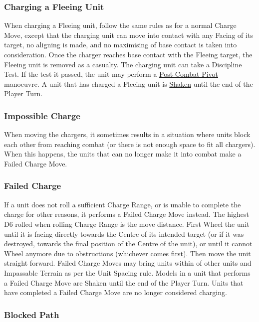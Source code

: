 \subsubsection{Charging a Fleeing Unit}

When charging a Fleeing unit, follow the same rules as for a normal Charge Move, except that the charging unit can move into contact with any Facing of its target, no aligning is made, and no maximising of base contact is taken into consideration. Once the charger reaches base contact with the Fleeing target, the Fleeing unit is removed as a casualty. The charging unit can take a Discipline Test. If the test it passed, the unit may perform a \hyperref[post_combat_pivot]{Post-Combat Pivot} manoeuvre. A unit that has charged a Fleeing unit is \hyperref[shaken]{Shaken} until the end of the Player Turn.

\subsubsection{Impossible Charge}

When moving the chargers, it sometimes results in a situation where units block each other from reaching combat (or there is not enough space to fit all chargers). When this happens, the units that can no longer make it into combat make a Failed Charge Move.

\subsubsection{Failed Charge}
\label{failed_charge}

If a unit does not roll a sufficient Charge Range, or is unable to complete the charge for other reasons, it performs a Failed Charge Move instead. The highest D6 rolled when rolling Charge Range is the move distance. First Wheel the unit until it is facing directly towards the Centre of its intended target (or if it was destroyed, towards the final position of the Centre of the unit), or until it cannot Wheel anymore due to obstructions (whichever comes first). Then move the unit straight forward. Failed Charge Moves may bring units within  of other units and Impassable Terrain as per the Unit Spacing rule. Models in a unit that performs a Failed Charge Move are Shaken until the end of the Player Turn. Units that have completed a Failed Charge Move are no longer considered charging.

\subsubsection{Blocked Path}
\label{blocked_path}

